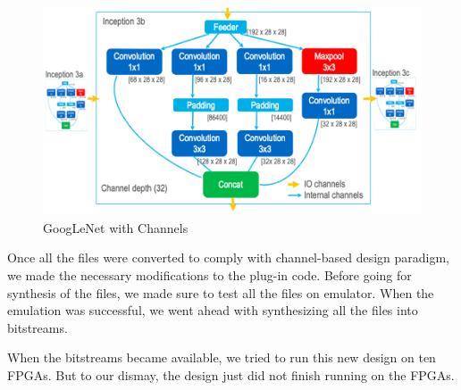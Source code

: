 \begin{figure}[!htb]
  \includegraphics[width=\textwidth,height=\textheight,keepaspectratio]{img/GoogLeNet_Channels.png}
  \caption{GoogLeNet with Channels}
  \label{fig:GoogLeNet_Channels}
\end{figure}


Once all the files were converted to comply with channel-based design paradigm, we made the necessary modifications to the plug-in code. Before going for synthesis of the files, we made sure to test all the files on emulator. When the emulation was successful, we went ahead with synthesizing all the files into bitstreams.

When the bitstreams became available, we tried to run this new design on ten FPGAs. But to our dismay, the design just did not finish running on the FPGAs. 
































